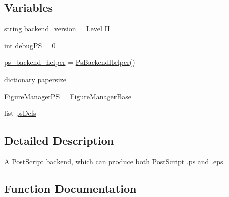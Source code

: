 \subsection*{Variables}
\begin{DoxyCompactItemize}
\item 
string \hyperlink{namespacematplotlib_1_1backends_1_1backend__ps_aa2a26be019f2a6fafae780106d6d952a}{backend\+\_\+version} = \textquotesingle{}Level II\textquotesingle{}
\item 
int \hyperlink{namespacematplotlib_1_1backends_1_1backend__ps_ac50fb83dd85f8b46986d39151a3dead8}{debug\+PS} = 0
\item 
\hyperlink{namespacematplotlib_1_1backends_1_1backend__ps_a775472009465547b35039f1a7baac84b}{ps\+\_\+backend\+\_\+helper} = \hyperlink{classmatplotlib_1_1backends_1_1backend__ps_1_1PsBackendHelper}{Ps\+Backend\+Helper}()
\item 
dictionary \hyperlink{namespacematplotlib_1_1backends_1_1backend__ps_a3de48a85a8f1b174f97b5bbe55e70fd7}{papersize}
\item 
\hyperlink{namespacematplotlib_1_1backends_1_1backend__ps_adfa74b97047cbf6de8434395031d750d}{Figure\+Manager\+PS} = Figure\+Manager\+Base
\item 
list \hyperlink{namespacematplotlib_1_1backends_1_1backend__ps_a12b37e17a387319d1aade2a56ccaa1f1}{ps\+Defs}
\end{DoxyCompactItemize}


\subsection{Detailed Description}
\begin{DoxyVerb}A PostScript backend, which can produce both PostScript .ps and .eps.
\end{DoxyVerb}
 

\subsection{Function Documentation}
\mbox{\label{namespacematplotlib_1_1backends_1_1backend__ps_af560d5ec999b291773f8e33c7dd4a2b9}} 
